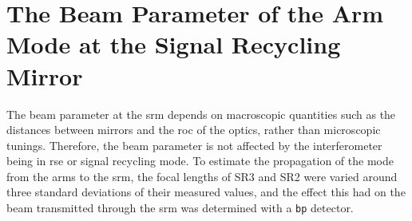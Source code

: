 \section{The Beam Parameter of the Arm Mode at the Signal Recycling Mirror}
\label{sec:beam_parameter_chapter_beam_parameter_simulation}
The beam parameter at the \gls{srm} depends on macroscopic quantities such as the distances between mirrors and the \gls{roc} of the optics, rather than microscopic tunings. Therefore, the beam parameter is not affected by the interferometer being in \gls{rse} or signal recycling mode. To estimate the propagation of the mode from the arms to the \gls{srm}, the focal lengths of SR3 and SR2 were varied around three standard deviations of their measured values, and the effect this had on the beam transmitted through the \gls{srm} was determined with a \texttt{bp} detector. %
